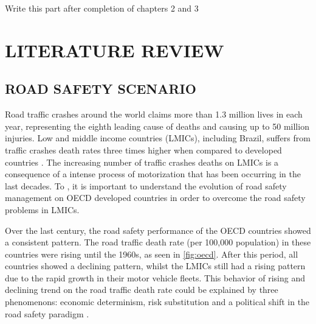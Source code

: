 Write this part after completion of chapters 2 and 3


\chapter{LITERATURE REVIEW}



\section{ROAD SAFETY SCENARIO}


Road traffic crashes around the world claims more than 1.3 million lives in each year, representing the eighth leading cause of deaths and causing up to 50 million injuries. Low and middle income countries (LMICs), including Brazil, suffers from traffic crashes death rates three times higher when compared to developed countries \cite{WHO2018}. The increasing number of traffic crashes deaths on LMICs is a consequence of a intense process of motorization that has been occurring in the last decades. To \textcite{Bhalla2016}, it is important to understand the evolution of road safety management on OECD developed countries in order to overcome the road safety problems in LMICs. 


Over the last century, the road safety performance of the OECD countries showed a consistent pattern. The road traffic death rate (per 100,000 population) in these countries were rising until the 1960s, as seen in \autoref{fig:oecd}. After this period, all countries showed a declining pattern, whilst the LMICs still had a rising pattern due to the rapid growth in their motor vehicle fleets. This behavior of rising and declining trend on the road traffic death rate could be explained by three phenomenons: economic determinism, risk substitution and a political shift in the road safety paradigm \cite{Bhalla2016}.

